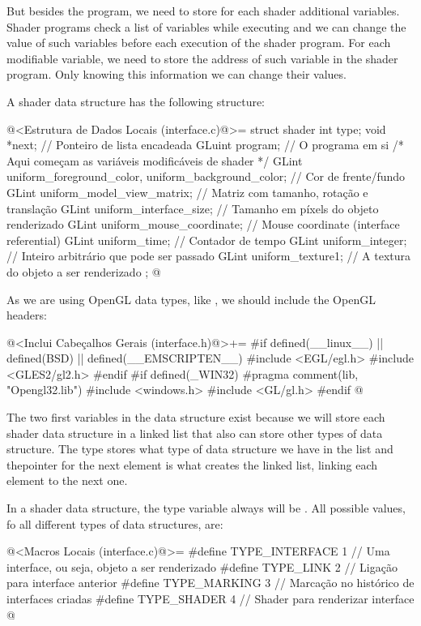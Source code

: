 But besides the program, we need to store for each shader additional
variables. Shader programs check a list of variables while executing
and we can change the value of such variables before each execution of
the shader program. For each modifiable variable, we need to store the
address of such variable in the shader program. Only knowing this
information we can change their values.

A shader data structure has the following structure:

\iniciocodigo
@<Estrutura de Dados Locais (interface.c)@>=
struct shader {
  int type;
  void *next; // Ponteiro de lista encadeada
  GLuint program; // O programa em si
  /* Aqui começam as variáveis modificáveis de shader */
  GLint uniform_foreground_color, uniform_background_color; // Cor de frente/fundo
  GLint uniform_model_view_matrix; // Matriz com tamanho, rotação e translação
  GLint uniform_interface_size; // Tamanho em píxels do objeto renderizado
  GLint uniform_mouse_coordinate; // Mouse coordinate (interface referential)
  GLint uniform_time; // Contador de tempo
  GLint uniform_integer; // Inteiro arbitrário que pode ser passado
  GLint uniform_texture1; // A textura do objeto a ser renderizado
};
@
\fimcodigo

As we are using OpenGL data types, like , we should
include the OpenGL headers:

\iniciocodigo
@<Inclui Cabeçalhos Gerais (interface.h)@>+=
#if defined(__linux__) || defined(BSD) || defined(__EMSCRIPTEN__)
#include <EGL/egl.h>
#include <GLES2/gl2.h>
#endif
#if defined(_WIN32)
#pragma comment(lib, "Opengl32.lib")
#include <windows.h>
#include <GL/gl.h>
#endif
@
\fimcodigo

The two first variables in the data structure exist because we will
store each shader data structure in a linked list that also can store
other types of data structure. The type stores what type of data
structure we have in the list and thepointer for the next element is
what creates the linked list, linking each element to the next one.

In a shader data structure, the type variable always will
be . All possible values, fo all different
types of data structures, are:

\iniciocodigo
@<Macros Locais (interface.c)@>=
#define TYPE_INTERFACE 1 // Uma interface, ou seja, objeto a ser renderizado
#define TYPE_LINK      2 // Ligação para interface anterior
#define TYPE_MARKING   3 // Marcação no histórico de interfaces criadas
#define TYPE_SHADER    4 // Shader para renderizar interface
@
\fimcodigo

